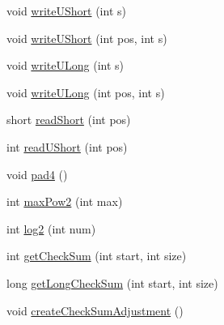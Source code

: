 \begin{DoxyCompactItemize}
\item 
void \mbox{\hyperlink{classorg_1_1newdawn_1_1slick_1_1tools_1_1hiero_1_1truetype_1_1_t_t_f_sub_set_file_a9a4efc8b486dad23193ba0949bf1e533}{write\+U\+Short}} (int s)
\item 
void \mbox{\hyperlink{classorg_1_1newdawn_1_1slick_1_1tools_1_1hiero_1_1truetype_1_1_t_t_f_sub_set_file_ab94f249489b553319eef170666abf62e}{write\+U\+Short}} (int pos, int s)
\item 
void \mbox{\hyperlink{classorg_1_1newdawn_1_1slick_1_1tools_1_1hiero_1_1truetype_1_1_t_t_f_sub_set_file_a20ed1072913a1ad998d59a761e8c4817}{write\+U\+Long}} (int s)
\item 
void \mbox{\hyperlink{classorg_1_1newdawn_1_1slick_1_1tools_1_1hiero_1_1truetype_1_1_t_t_f_sub_set_file_acc1498b805f621244e52985d135a5d41}{write\+U\+Long}} (int pos, int s)
\item 
short \mbox{\hyperlink{classorg_1_1newdawn_1_1slick_1_1tools_1_1hiero_1_1truetype_1_1_t_t_f_sub_set_file_a861f6d91c147573d61018bd6f2697eb9}{read\+Short}} (int pos)
\item 
int \mbox{\hyperlink{classorg_1_1newdawn_1_1slick_1_1tools_1_1hiero_1_1truetype_1_1_t_t_f_sub_set_file_a285a94a3f338e2126273b089bd1d2f24}{read\+U\+Short}} (int pos)
\item 
void \mbox{\hyperlink{classorg_1_1newdawn_1_1slick_1_1tools_1_1hiero_1_1truetype_1_1_t_t_f_sub_set_file_a0c2daa792c418ab2f19378ed0189e713}{pad4}} ()
\item 
int \mbox{\hyperlink{classorg_1_1newdawn_1_1slick_1_1tools_1_1hiero_1_1truetype_1_1_t_t_f_sub_set_file_ae4f27a0cc27d9ae055fbf4cde7ee924f}{max\+Pow2}} (int max)
\item 
int \mbox{\hyperlink{classorg_1_1newdawn_1_1slick_1_1tools_1_1hiero_1_1truetype_1_1_t_t_f_sub_set_file_a121fd511ed2d80cd0653c0598c055538}{log2}} (int num)
\item 
int \mbox{\hyperlink{classorg_1_1newdawn_1_1slick_1_1tools_1_1hiero_1_1truetype_1_1_t_t_f_sub_set_file_a1626ba6cefcce691896866cd811ea675}{get\+Check\+Sum}} (int start, int size)
\item 
long \mbox{\hyperlink{classorg_1_1newdawn_1_1slick_1_1tools_1_1hiero_1_1truetype_1_1_t_t_f_sub_set_file_a45ad92d45877b63239a2d2a849c8552d}{get\+Long\+Check\+Sum}} (int start, int size)
\item 
void \mbox{\hyperlink{classorg_1_1newdawn_1_1slick_1_1tools_1_1hiero_1_1truetype_1_1_t_t_f_sub_set_file_a4e488d6cb27400de20b0a21592e55701}{create\+Check\+Sum\+Adjustment}} ()
\end{DoxyCompactItemize}
